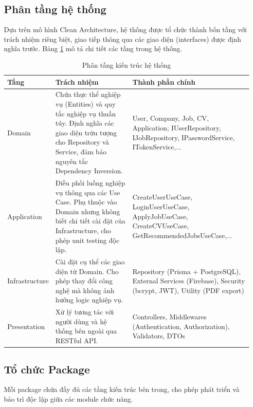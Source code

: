 \subsection{Phân tầng hệ thống}
\label{subsec:system-layers}

Dựa trên mô hình Clean Architecture, hệ thống được tổ chức thành bốn tầng với trách nhiệm riêng biệt, giao tiếp thông qua các giao diện (interfaces) được định nghĩa trước. Bảng \ref{tab:system-layers} mô tả chi tiết các tầng trong hệ thống.

\begin{table}[H]
\centering
\caption{Phân tầng kiến trúc hệ thống}
\label{tab:system-layers}
\begin{tabular}{|p{2.5cm}|p{4.5cm}|p{5cm}|}
\hline
\textbf{Tầng} & \textbf{Trách nhiệm} & \textbf{Thành phần chính} \\
\hline
Domain & Chứa thực thể nghiệp vụ (Entities) và quy tắc nghiệp vụ thuần túy. Định nghĩa các giao diện trừu tượng cho Repository và Service, đảm bảo nguyên tắc Dependency Inversion. & User, Company, Job, CV, Application; IUserRepository, IJobRepository, IPasswordService, ITokenService,... \\
\hline
Application & Điều phối luồng nghiệp vụ thông qua các Use Case. Phụ thuộc vào Domain nhưng không biết chi tiết cài đặt của Infrastructure, cho phép unit testing độc lập. & CreateUserUseCase, LoginUserUseCase, ApplyJobUseCase, CreateCVUseCase, GetRecommendedJobsUseCase,... \\
\hline
Infrastructure & Cài đặt cụ thể các giao diện từ Domain. Cho phép thay đổi công nghệ mà không ảnh hưởng logic nghiệp vụ. & Repository (Prisma + PostgreSQL), External Services (Firebase), Security (bcrypt, JWT), Utility (PDF export) \\
\hline
Presentation & Xử lý tương tác với người dùng và hệ thống bên ngoài qua RESTful API. & Controllers, Middlewares (Authentication, Authorization), Validators, DTOs \\
\hline
\end{tabular}
\end{table}




\subsection{Tổ chức Package}
\label{subsec:package-organization}
 Mỗi package chứa đầy đủ các tầng kiến trúc bên trong, cho phép phát triển và bảo trì độc lập giữa các module chức năng.

